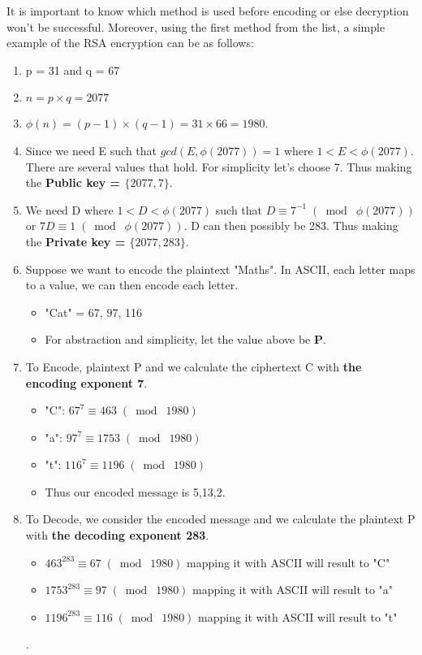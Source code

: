 \documentclass{article}
\begin{document}
It is important to know which method is used before encoding or else decryption won't be successful. Moreover, using the first method from the list, a simple example of the RSA encryption can be as follows:
\begin{enumerate}
    \item p = 31 and q = 67
    \item $n = p \times q = 2077$
    \item $\phi(n) = (p-1) \times (q-1) = 31 \times 66 = 1980$.
    \item Since we need E such that $gcd(E, \phi(2077)) = 1$ where $1 < E < \phi(2077)$. There are several values that hold. For simplicity let's choose 7. Thus making the \textbf{Public key = $\{2077, 7\}$}.
    \item We need D where $1 < D < \phi(2077)$ such that $D \equiv 7^{-1} \;(\bmod\; \phi(2077))$ or $7D \equiv 1 \;(\bmod\; \phi(2077))$. D can then possibly be 283. Thus making the \textbf{Private key = $\{2077, 283\}$}.
    \item Suppose we want to encode the plaintext "Maths". In ASCII, each letter maps to a value, we can then encode each letter.
    \begin{itemize}
        \item "Cat" = 67, 97, 116
        \item For abstraction and simplicity, let the value above be \textbf{P}.
    \end{itemize}
    \item To Encode, plaintext P and we calculate the ciphertext C with \textbf{the encoding exponent 7}.
    \begin{itemize}
        \item "C": $67^7 \equiv 463 \;(\bmod\; 1980)$
        \item "a": $97^7 \equiv 1753 \;(\bmod\; 1980)$
        \item "t": $116^7 \equiv 1196 \;(\bmod\; 1980)$
        \item Thus our encoded message is 5,13,2.
    \end{itemize}
    \item To Decode, we consider the encoded message and we calculate the plaintext P with \textbf{the decoding exponent 283}. 
    \begin{itemize}
        \item $463^{283} \equiv 67 \;(\bmod\; 1980)$ mapping it with ASCII will result to "C"
        \item $1753^{283} \equiv 97 \;(\bmod\; 1980)$ mapping it with ASCII will result to "a"
        \item $1196^{283} \equiv 116 \;(\bmod\; 1980)$ mapping it with ASCII will result to "t"
    \end{itemize}.
\end{enumerate}
\end{document}
